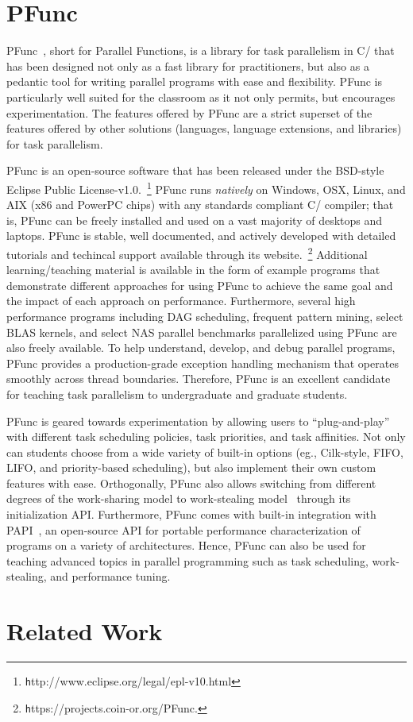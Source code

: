 \documentclass[9pt,twocolumn,letter]{article}
\begin{document}
\section{PFunc}
\label{sec:pfunc}
PFunc~\cite{kambadur09:pfunc}, short for Parallel Functions, is a library for
task parallelism in C/\Cpp{} that has been designed not only as a fast library
for practitioners, but also as a pedantic tool for writing parallel programs
with ease and flexibility.
%
PFunc is particularly well suited for the classroom as it not only permits, but
encourages experimentation.
%
The features offered by PFunc are a strict superset of the features offered by
other solutions (languages, language extensions, and libraries) for task
parallelism.

%
%
PFunc is an open-source software that has been released under the BSD-style
Eclipse Public License-v1.0.~\footnote{\texttt
http://www.eclipse.org/legal/epl-v10.html}
%
PFunc runs \textit{natively} on Windows, OSX, Linux, and AIX (x86 and
PowerPC chips) with any standards compliant C/\Cpp{} compiler; that is, PFunc
can be freely installed and used on a vast majority of desktops and
laptops.
%
PFunc is stable, well documented, and actively developed with detailed
tutorials and techincal support available through its
website.~\footnote{\texttt https://projects.coin-or.org/PFunc.}
%
Additional learning/teaching material is available in the form of example
programs that demonstrate different approaches for using PFunc to achieve the
same goal and the impact of each approach on performance.
%
Furthermore, several high performance programs including DAG scheduling,
frequent pattern mining, select BLAS kernels, and select NAS parallel
benchmarks parallelized using PFunc are also freely available.
%
To help understand, develop, and debug parallel programs, PFunc provides a
production-grade exception handling mechanism that operates smoothly across
thread boundaries.
%
Therefore, PFunc is an excellent candidate for teaching task parallelism to 
undergraduate and graduate students.

%
%
PFunc is geared towards experimentation by allowing users to ``plug-and-play''
with different task scheduling policies, task priorities, and task affinities.
%
Not only can students choose from a wide variety of built-in options (eg.,
Cilk-style, FIFO, LIFO, and priority-based scheduling), but also implement
their own custom features with ease.
%
Orthogonally, PFunc also allows switching from different degrees of the
work-sharing model to work-stealing model~\cite{Blumofe94} through its
initialization API.
%
Furthermore, PFunc comes with built-in integration with PAPI~\cite{papi}, an
open-source API for portable performance characterization of programs on a
variety of architectures. 
%
Hence, PFunc can also be used for teaching advanced topics in parallel
programming such as task scheduling, work-stealing, and performance tuning. 

%
%
\section{Related Work}

\tiny


\end{document}
